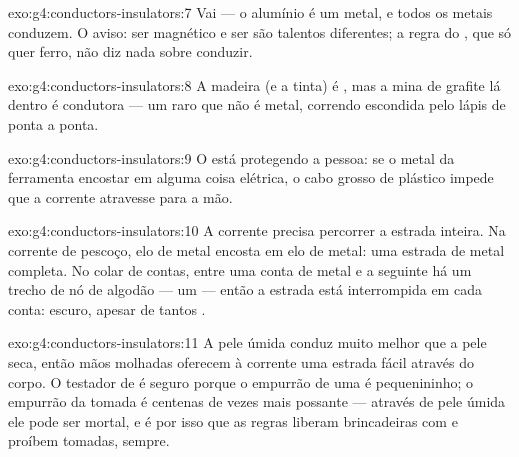 \begin{solution}{exo:g4:conductors-insulators:7}
Vai --- o alumínio é um metal, e todos os metais conduzem. O aviso:
ser magnético e ser  são talentos diferentes; a regra do ,
que só quer ferro, não diz nada sobre conduzir.
\end{solution}

\begin{solution}{exo:g4:conductors-insulators:8}
A madeira (e a tinta) é , mas a mina de grafite lá dentro é
condutora --- um raro  que não é metal, correndo escondida
pelo lápis de ponta a ponta.
\end{solution}

\begin{solution}{exo:g4:conductors-insulators:9}
O  está protegendo a pessoa: se o metal da ferramenta
encostar em alguma coisa elétrica, o cabo grosso de plástico impede
que a corrente atravesse para a mão.
\end{solution}

\begin{solution}{exo:g4:conductors-insulators:10}
A corrente precisa percorrer a estrada inteira. Na corrente de
pescoço, elo de metal encosta em elo de metal: uma estrada de metal
completa. No colar de contas, entre uma conta de metal e a seguinte
há um trecho de nó de algodão --- um  --- então a estrada
está interrompida em cada conta: escuro, apesar de tantos .
\end{solution}

\begin{solution}{exo:g4:conductors-insulators:11}
A pele úmida conduz muito melhor que a pele seca, então mãos
molhadas oferecem à corrente uma estrada fácil através do corpo. O
testador de  é seguro porque o empurrão de uma  é
pequenininho; o empurrão da tomada é centenas de vezes mais possante
--- através de pele úmida ele pode ser mortal, e é por isso que as
regras liberam brincadeiras com  e proíbem tomadas, sempre.
\end{solution}
